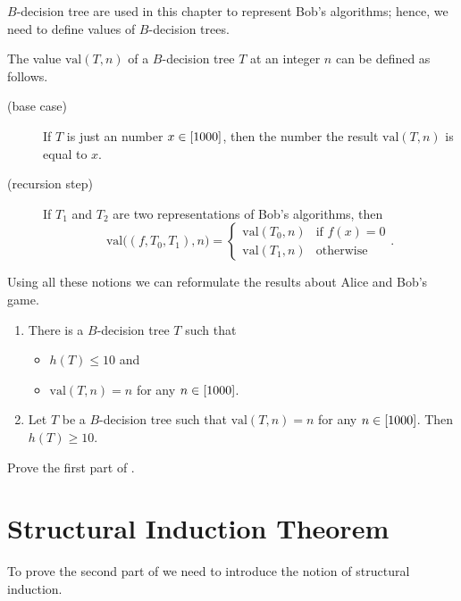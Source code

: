 $B$-decision tree are used in this chapter to represent Bob's algorithms;
hence, we need to define values of $B$-decision trees.
\begin{definition}
  The value
  $\mathrm{val}(T, n)$ of a $B$-decision tree $T$ at an integer $n$ can
  be defined as follows.
  \begin{description}
      \item [(base case)] If $T$ is just an number $x \in {[{1000}]}$,
        then the number the result $\mathrm{val}(T, n)$ is equal to $x$.
      \item[(recursion step)] If $T_1$ and $T_2$ are two representations of
        Bob's algorithms, then
        \[
          \mathrm{val}\Big((f, T_0, T_1), n\Big) =
          \begin{cases}
            \mathrm{val}(T_0, n) & \text{if } f(x) = 0 \\
            \mathrm{val}(T_1, n) & \text{otherwise}
          \end{cases}.
        \]
  \end{description}
\end{definition}

Using all these notions we can reformulate the results about Alice and Bob's
game.
\begin{theorem}
\label{theorem:guess-the-number}
  \begin{enumerate}
    \item There is a $B$-decision tree $T$ such that
      \begin{itemize}
        \item $h(T) \le 10$ and
        \item $\mathrm{val}(T, n) = n$ for any $n \in {[{1000}]}$.
      \end{itemize}
    \item Let $T$ be a $B$-decision tree such that $\mathrm{val}(T, n) = n$ for
      any $n \in {[{1000}]}$. Then $h(T) \ge 10$.
  \end{enumerate}
\end{theorem}

\begin{exercise}
  Prove the first part of .
\end{exercise}

\section{Structural Induction Theorem}
To prove the second part of  we need
to introduce the notion of structural induction.

